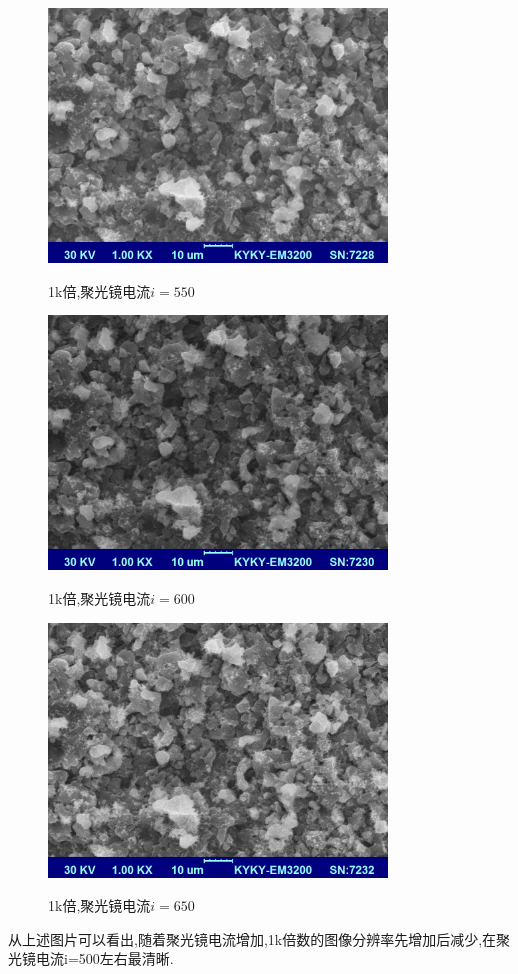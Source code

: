 \documentclass[a4paper]{article}
\begin{document}
\begin{figure}[H]
 \centering
 \caption{1k倍,聚光镜电流$i=550$}
 \includegraphics[height=6.75cm, width=9cm]{pictures/550/1k.bmp}
 \label{result:fig10}
\end{figure}

\begin{figure}[H]
 \centering
 \caption{1k倍,聚光镜电流$i=600$}
 \includegraphics[height=6.75cm, width=9cm]{pictures/600/1k.bmp}
 \label{result:fig11}
\end{figure}

\begin{figure}[H]
 \centering
 \caption{1k倍,聚光镜电流$i=650$}
 \includegraphics[height=6.75cm, width=9cm]{pictures/650/1k.bmp}
 \label{result:fig12}
\end{figure}
从上述图片可以看出,随着聚光镜电流增加,1k倍数的图像分辨率先增加后减少,在聚光镜电流i=500左右最清晰.
\end{document}
